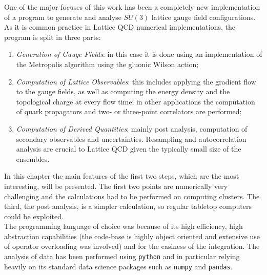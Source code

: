 One of the major focuses of this work has been a completely new implementation of a program to generate and analyse $SU(3)$ lattice gauge field configurations. As it is common practice in Lattice QCD numerical implementations, the program is split in three parts:
\begin{enumerate}
    \item \textit{Generation of Gauge Fields}: in this case it is done using an implementation of the Metropolis algorithm using the gluonic Wilson action;
    \item \textit{Computation of Lattice Observables}: this includes applying the gradient flow to the gauge fields, as well as computing the energy density and the topological charge at every flow time; in other applications the computation of quark propagators and two- or three-point correlators are performed; 
    \item \textit{Computation of Derived Quantities}: mainly post analysis, computation of secondary observables and uncertainties. Resampling and autocorrelation analysis are crucial to Lattice QCD given the typically small size of the ensembles. 
\end{enumerate}
In this chapter the main features of the first two steps, which are the most interesting, will be presented. The first two points are numerically very challenging and the calculations had to be performed on computing clusters. The third, the post analysis, is a simpler calculation, so regular tabletop computers could be exploited. \\
The programming language of choice was \cpp because of its high efficiency, high abstraction capabilities (the code-base is highly object oriented and extensive use of operator overloading was involved) and for the easiness of the \mpi integration. The analysis of data has been performed using \texttt{python} and in particular relying heavily on its standard data science packages such as \texttt{numpy} and \texttt{pandas}.
  
